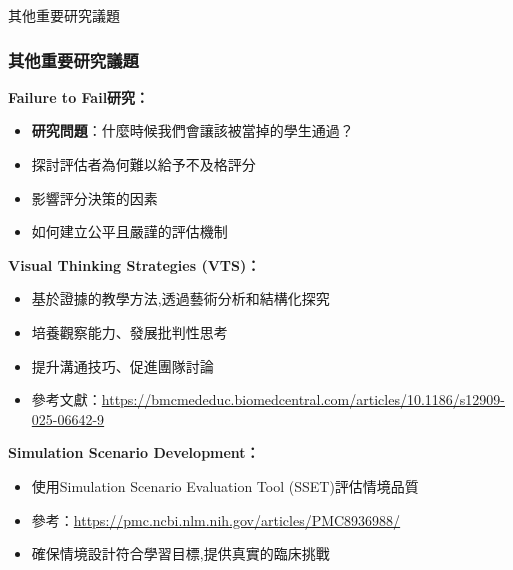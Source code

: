 \documentclass[aspectratio=169]{beamer}
\begin{document}
\begin{frame}{其他重要研究議題}
\frametitle{其他重要研究議題}

\textbf{Failure to Fail研究：}
\begin{itemize}
    \item \textbf{研究問題}：什麼時候我們會讓該被當掉的學生通過？
    \item 探討評估者為何難以給予不及格評分
    \item 影響評分決策的因素
    \item 如何建立公平且嚴謹的評估機制
\end{itemize}

\vspace{0.5cm}

\textbf{Visual Thinking Strategies (VTS)：}
\begin{itemize}
    \item 基於證據的教學方法,透過藝術分析和結構化探究
    \item 培養觀察能力、發展批判性思考
    \item 提升溝通技巧、促進團隊討論
    \item 參考文獻：\url{https://bmcmededuc.biomedcentral.com/articles/10.1186/s12909-025-06642-9}
\end{itemize}

\vspace{0.5cm}
\tiny
\textbf{Simulation Scenario Development：}
\begin{itemize}
    \item 使用Simulation Scenario Evaluation Tool (SSET)評估情境品質
    \item 參考：\url{https://pmc.ncbi.nlm.nih.gov/articles/PMC8936988/}
    \item 確保情境設計符合學習目標,提供真實的臨床挑戰
\end{itemize}
\end{frame}
\end{document}

